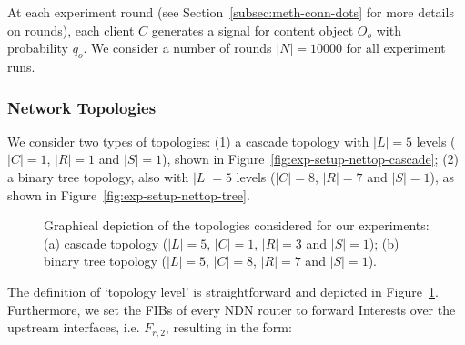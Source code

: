 At each experiment round (see Section~\ref{subsec:meth-conn-dots} for more details on 
rounds), each client $C$ generates a signal for content object $O_o$ with 
probability $q_{o}$. We consider a number of rounds 
$|N| = 10000$ for all experiment runs.\shortvertbreak

\subsubsection{Network Topologies}
\label{subsec:exp-setup-nettop}

We consider two types of topologies: (1) a cascade topology with $|L| = 5$ levels 
($|C| = 1$, $|R| = 1$ and $|S| = 1$), shown in Figure~\ref{fig:exp-setup-nettop-cascade}; (2) a binary 
tree topology, also with $|L| = 5$ levels ($|C| = 8$, $|R| = 7$ and $|S| = 1$), as 
shown in Figure~\ref{fig:exp-setup-nettop-tree}.\shortvertbreak

\begin{figure}[h!]
    \centering


    \cprotect\caption{Graphical depiction of the topologies considered for 
        our experiments: (a) cascade topology ($|L| = 5$, $|C| = 1$, $|R| = 3$ 
        and $|S| = 1$); (b) binary tree topology 
        ($|L| = 5$, $|C| = 8$, $|R| = 7$ and $|S| = 1$).}
    \label{fig:exp-setup-nettop}

\end{figure}

The definition of `topology level' is straightforward and depicted 
in Figure~\ref{fig:exp-setup-nettop}. Furthermore, we set the FIBs of every 
NDN router to forward Interests over the upstream interfaces, i.e. $F_{r,2}$, 
resulting in the form:


